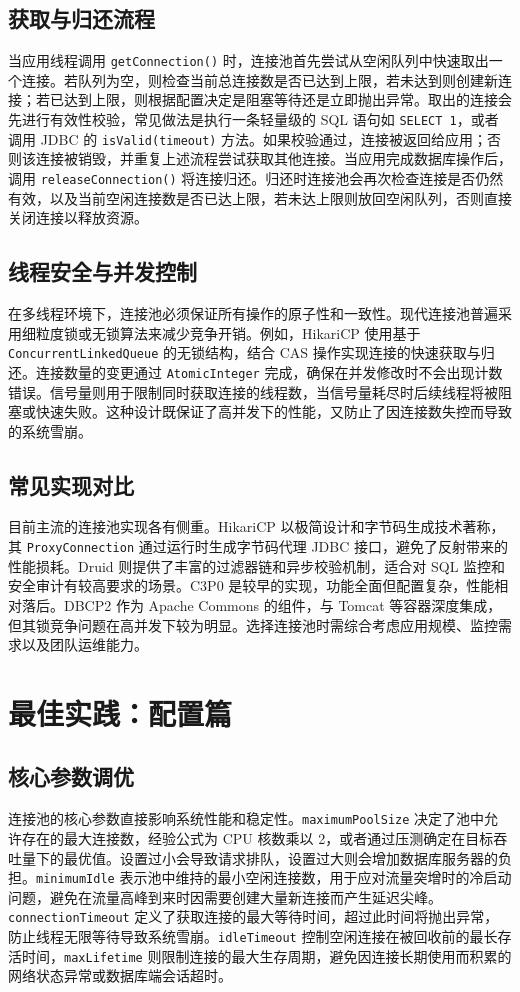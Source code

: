 \section{获取与归还流程}
当应用线程调用 \texttt{getConnection()} 时，连接池首先尝试从空闲队列中快速取出一个连接。若队列为空，则检查当前总连接数是否已达到上限，若未达到则创建新连接；若已达到上限，则根据配置决定是阻塞等待还是立即抛出异常。取出的连接会先进行有效性校验，常见做法是执行一条轻量级的 SQL 语句如 \texttt{SELECT 1}，或者调用 JDBC 的 \texttt{isValid(timeout)} 方法。如果校验通过，连接被返回给应用；否则该连接被销毁，并重复上述流程尝试获取其他连接。当应用完成数据库操作后，调用 \texttt{releaseConnection()} 将连接归还。归还时连接池会再次检查连接是否仍然有效，以及当前空闲连接数是否已达上限，若未达上限则放回空闲队列，否则直接关闭连接以释放资源。\par
\section{线程安全与并发控制}
在多线程环境下，连接池必须保证所有操作的原子性和一致性。现代连接池普遍采用细粒度锁或无锁算法来减少竞争开销。例如，HikariCP 使用基于 \texttt{ConcurrentLinkedQueue} 的无锁结构，结合 CAS 操作实现连接的快速获取与归还。连接数量的变更通过 \texttt{AtomicInteger} 完成，确保在并发修改时不会出现计数错误。信号量则用于限制同时获取连接的线程数，当信号量耗尽时后续线程将被阻塞或快速失败。这种设计既保证了高并发下的性能，又防止了因连接数失控而导致的系统雪崩。\par
\section{常见实现对比}
目前主流的连接池实现各有侧重。HikariCP 以极简设计和字节码生成技术著称，其 \texttt{ProxyConnection} 通过运行时生成字节码代理 JDBC 接口，避免了反射带来的性能损耗。Druid 则提供了丰富的过滤器链和异步校验机制，适合对 SQL 监控和安全审计有较高要求的场景。C3P0 是较早的实现，功能全面但配置复杂，性能相对落后。DBCP2 作为 Apache Commons 的组件，与 Tomcat 等容器深度集成，但其锁竞争问题在高并发下较为明显。选择连接池时需综合考虑应用规模、监控需求以及团队运维能力。\par
\chapter{最佳实践：配置篇}
\section{核心参数调优}
连接池的核心参数直接影响系统性能和稳定性。\texttt{maximumPoolSize} 决定了池中允许存在的最大连接数，经验公式为 CPU 核数乘以 2，或者通过压测确定在目标吞吐量下的最优值。设置过小会导致请求排队，设置过大则会增加数据库服务器的负担。\texttt{minimumIdle} 表示池中维持的最小空闲连接数，用于应对流量突增时的冷启动问题，避免在流量高峰到来时因需要创建大量新连接而产生延迟尖峰。\texttt{connectionTimeout} 定义了获取连接的最大等待时间，超过此时间将抛出异常，防止线程无限等待导致系统雪崩。\texttt{idleTimeout} 控制空闲连接在被回收前的最长存活时间，\texttt{maxLifetime} 则限制连接的最大生存周期，避免因连接长期使用而积累的网络状态异常或数据库端会话超时。\par

